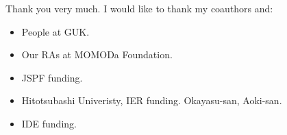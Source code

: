 \begin{frame}{}
\vspace{3ex}
\hfil{\Large Thank you very much.}
\vspace{3ex}
I would like to thank my coauthors and:
\begin{itemize}
\vspace{1.0ex}\setlength{\itemsep}{1.0ex}\setlength{\baselineskip}{12pt}
\item	People at GUK.
\item	Our RAs at MOMODa Foundation.
\item	JSPF funding.
\item	Hitotsubashi Univeristy, IER funding. Okayasu-san, Aoki-san.
\item	IDE funding.
\end{itemize}

\end{frame}

\begin{frame}[allowframebreaks]{}
\footnotesize
\setlength{\baselineskip}{10pt}

\end{frame}



